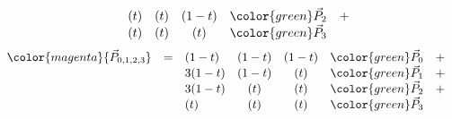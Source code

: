 \begin{frame}
{\[\begin{array}{lclccrc}
                                       & & (  t)&(  t)&(1-t)&{\color{green}\vec{P}_2} &+ \\
                                       & & (  t)&(  t)&(  t)&{\color{green}\vec{P}_3} &
  \end{array}
  \]
  }
  {\tiny
  \[
  \begin{array}{lclccrc}
    \color{magenta}{\vec{P}_{0,1,2,3}} &=& (1-t)&(1-t)&(1-t)&{\color{green}\vec{P}_0} &+ \\
                                       & & 3(1-t)&(1-t)&(  t)&{\color{green}\vec{P}_1} &+ \\
                                       & & 3(1-t)&(  t)&(  t)&{\color{green}\vec{P}_2} &+ \\
                                       & & (  t)&(  t)&(  t)&{\color{green}\vec{P}_3} &
  \end{array}
  \]
  }

\end{frame}

